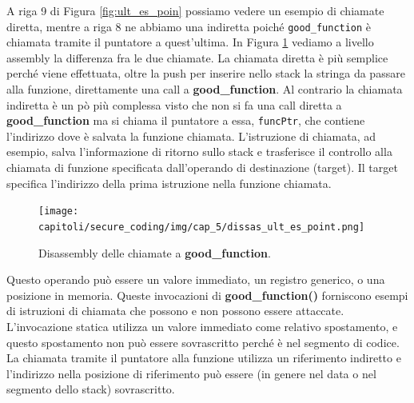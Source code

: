 A riga 9 di Figura \ref{fig:ult_es_poin} possiamo vedere un esempio di chiamate diretta,
mentre a riga 8 ne abbiamo una indiretta poiché \verb|good_function| è chiamata tramite
il puntatore a quest'ultima. In Figura \ref{fig:dissas_ult_es_poin} vediamo a livello
assembly la differenza fra le due chiamate. La chiamata diretta è più semplice perché
viene effettuata, oltre la push per inserire nello stack la stringa da passare alla
funzione, direttamente una call a \textbf{good\_function}. Al contrario la chiamata
indiretta è un pò più complessa visto che non si fa una call
diretta a \textbf{good\_function} ma si chiama il puntatore a essa, \verb|funcPtr|,
che contiene l'indirizzo dove è salvata la funzione chiamata. L'istruzione di chiamata,
ad esempio, salva l'informazione di ritorno sullo stack e trasferisce il controllo
alla chiamata di funzione specificata dall'operando di destinazione (target). Il target
specifica l'indirizzo della prima istruzione nella funzione chiamata.

\begin{figure}[H]
	\centering
	\texttt{[image: capitoli/secure\_coding/img/cap\_5/dissas\_ult\_es\_point.png]}
	\caption{Disassembly delle chiamate a \textbf{good\_function}.}\label{fig:dissas_ult_es_poin}
\end{figure}

Questo operando può essere un valore immediato, un registro generico, o una posizione
in memoria. Queste invocazioni di \textbf{good\_function()} forniscono esempi di
istruzioni di chiamata che possono e non possono essere attaccate. L'invocazione
statica utilizza un valore immediato come relativo spostamento, e questo spostamento
non può essere sovrascritto perché è nel segmento di codice. La chiamata tramite il
puntatore alla funzione utilizza un riferimento indiretto e l'indirizzo nella posizione
di riferimento può essere (in genere nel data o nel segmento dello stack) sovrascritto.
